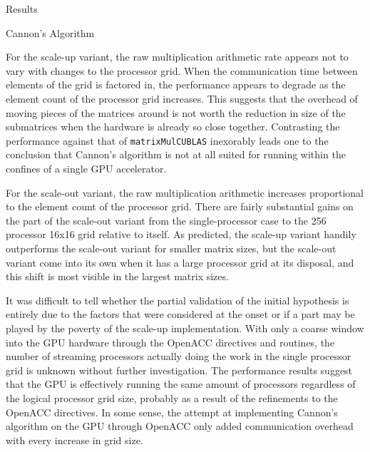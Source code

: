 \documentclass{article}
\begin{document}
\begin{section}{Results}
\begin{subsection}{Cannon's Algorithm}
\begin{paragraph}{}
    \end{paragraph}
    \begin{paragraph}{}
      For the scale-up variant, the raw multiplication arithmetic rate appears not to vary with changes to the processor grid. When the
      communication time between elements of the grid is factored in, the performance appears to degrade as the element count of the
      processor grid increases. This suggests that the overhead of moving pieces of the matrices around is not worth the reduction in
      size of the submatrices when the hardware is already so close together. Contrasting the performance against that of \texttt{matrixMulCUBLAS}
      inexorably leads one to the conclusion that Cannon's algorithm is not at all suited for running within the confines of a single GPU accelerator.
    \end{paragraph}
    \begin{paragraph}{}
      For the scale-out variant, the raw multiplication arithmetic increases proportional to the element count of the processor grid. There are
      fairly substantial gains on the part of the scale-out variant from the single-processor case to the 256 processor 16x16 grid relative to itself.
      As predicted, the scale-up variant handily outperforms the scale-out variant for smaller matrix sizes, but the scale-out variant come into
      its own when it has a large processor grid at its disposal, and this shift is most visible in the largest matrix sizes.
    \end{paragraph}
    \begin{paragraph}{}
      It was difficult to tell whether the partial validation of the initial hypothesis is entirely due to the factors that were considered
      at the onset or if a part may be played by the poverty of the scale-up implementation. With only a coarse window into the GPU hardware through
      the OpenACC directives and routines, the number of streaming processors actually doing the work in the single processor grid is unknown without
      further investigation. The performance results suggest that the GPU is effectively running the same amount of processors regardless of the
      logical processor grid size, probably as a result of the refinements to the OpenACC directives. In some sense, the attempt at implementing
      Cannon's algorithm on the GPU through OpenACC only added communication overhead with every increase in grid size.

\end{paragraph}
\end{subsection}
\end{section}
\end{document}
